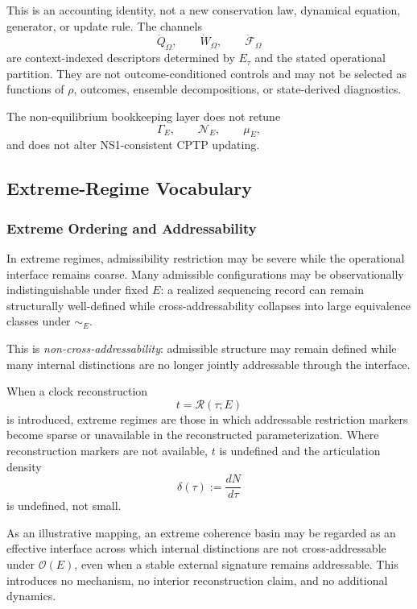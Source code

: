 \documentclass[aps,prx,onecolumn,11pt]{revtex4-2}
\theoremstyle{plain}
\theoremstyle{definition}
\theoremstyle{remark}
\begin{document}
This is an accounting identity, not a new conservation law, dynamical
equation, generator, or update rule. The channels
\[
\dot{Q}_\Omega,
\qquad
\dot{W}_\Omega,
\qquad
\dot{\mathcal{F}}_\Omega
\]
are context-indexed descriptors determined by \(E_\tau\) and the stated
operational partition. They are not outcome-conditioned controls and
may not be selected as functions of \(\rho\), outcomes, ensemble
decompositions, or state-derived diagnostics.

The non-equilibrium bookkeeping layer does not retune
\[
\Gamma_E,
\qquad
\mathcal N_E,
\qquad
\mu_E,
\]
and does not alter NS1-consistent CPTP updating.

\subsection{Extreme-Regime Vocabulary}
\label{appB:extreme_regime_vocabulary}

\subsubsection{Extreme Ordering and Addressability}
\label{appB:extreme_ordering_accessibility}

In extreme regimes, admissibility restriction may be severe while the
operational interface remains coarse. Many admissible configurations may
be observationally indistinguishable under fixed \(E\): a realized
sequencing record can remain structurally well-defined while
cross-addressability collapses into large equivalence classes under
\(\sim_E\).

This is \emph{non-cross-addressability}: admissible structure may remain
defined while many internal distinctions are no longer jointly
addressable through the interface.

When a clock reconstruction
\[
t=\mathcal R(\tau;E)
\]
is introduced, extreme regimes are those in which addressable
restriction markers become sparse or unavailable in the reconstructed
parameterization. Where reconstruction markers are not available,
\(t\) is undefined and the articulation density
\[
\delta(\tau):=\frac{dN}{d\tau}
\]
is undefined, not small.

As an illustrative mapping, an extreme coherence basin may be regarded
as an effective interface across which internal distinctions are not
cross-addressable under \(\mathcal O(E)\), even when a stable external
signature remains addressable. This introduces no mechanism, no
interior reconstruction claim, and no additional dynamics.
\end{document}
